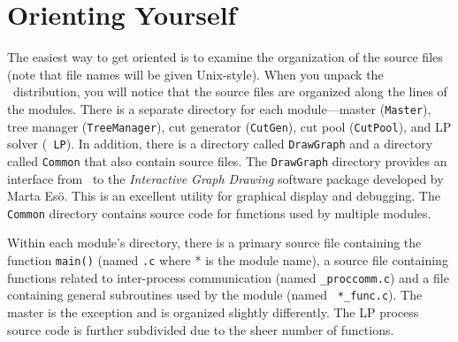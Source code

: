 
\section{Orienting Yourself}

The easiest way to get oriented is to examine the organization of the source
files (note that file names will be given Unix-style). When you unpack the
\BB\ distribution, you will notice that the source files are organized along
the lines of the modules.  There is a separate directory for each
module---master ({\tt Master}), tree manager ({\tt TreeManager}), cut
generator ({\tt CutGen}), cut pool ({\tt CutPool}), and LP solver ({\tt
LP}). In addition, there is a directory called {\tt DrawGraph} and a directory
called {\tt Common} that also contain source files. The {\tt DrawGraph}
directory provides an interface from \BB\ to the {\em Interactive Graph
Drawing} software package developed by Marta Es\"o. This is an excellent
utility for graphical display and debugging. The {\tt Common} directory
contains source code for functions used by multiple modules.

Within each module's directory, there is a primary source file
containing the function {\tt main()} (named {\tt *.c} where * is the
module name), a source file containing functions related to
inter-process communication (named {\tt *\_proccomm.c}) and a file
containing general subroutines used by the module (named {\tt
*\_func.c}). The master is the exception and is organized slightly
differently. The LP process source code is further subdivided due to
the sheer number of functions.

